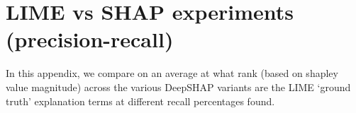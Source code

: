 
\chapter{LIME vs SHAP experiments (precision-recall)} %

\label{AppendixB} %


\vspace{-2em}
In this appendix, we compare on an average at what rank (based on shapley value magnitude) across the various DeepSHAP variants are the LIME `ground truth' explanation terms at different recall percentages found. 
